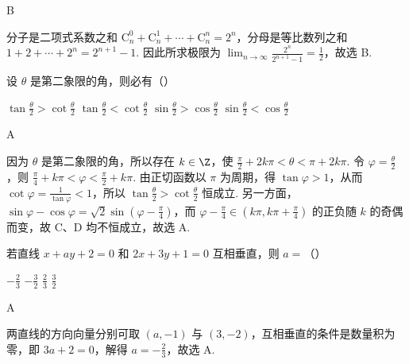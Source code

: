 \begin{answer}
B
\end{answer}

\begin{solution}
分子是二项式系数之和 \(\mathrm C_n^0 + \mathrm C_n^1 + \cdots + \mathrm C_n^n = 2^n\)，分母是等比数列之和 \(1 + 2 + \cdots + 2^n = 2^{n+1} - 1\). 因此所求极限为 \(\displaystyle\lim_{n \to \infty} \frac{2^n}{2^{n+1} - 1} = \frac{1}{2}\)，故选 B.
\end{solution}

\begin{problem}
设 \(\theta\) 是第二象限的角，则必有（\quad）

\choices
    {\(\tan \frac{\theta}{2} > \cot \frac{\theta}{2}\)}
    {\(\tan \frac{\theta}{2} < \cot \frac{\theta}{2}\)}
    {\(\sin \frac{\theta}{2} > \cos \frac{\theta}{2}\)}
    {\(\sin \frac{\theta}{2} < \cos \frac{\theta}{2}\)}
\end{problem}

\begin{answer}
A
\end{answer}

\begin{solution}
因为 \(\theta\) 是第二象限的角，所以存在 \(k \in \Z\)，使 \(\frac{\pi}{2} + 2k\pi < \theta < \pi + 2k\pi\). 令 \(\varphi = \frac{\theta}{2}\)，则 \(\frac{\pi}{4} + k\pi < \varphi < \frac{\pi}{2} + k\pi\). 由正切函数以 \(\pi\) 为周期，得 \(\tan \varphi > 1\)，从而 \(\cot \varphi = \frac{1}{\tan \varphi} < 1\)，所以 \(\tan \frac{\theta}{2} > \cot \frac{\theta}{2}\) 恒成立.
另一方面，\(\sin \varphi - \cos \varphi = \sqrt{2}\sin \left(\varphi - \frac{\pi}{4}\right)\)，而 \(\varphi - \frac{\pi}{4} \in \left(k\pi, k\pi + \frac{\pi}{4}\right)\) 的正负随 \(k\) 的奇偶而变，故 C、D 均不恒成立，故选 A.
\end{solution}

\begin{problem}
若直线 \(x + ay + 2 = 0\) 和 \(2x + 3y + 1 = 0\) 互相垂直，则 \(a =\)（\quad）

\choices
    {\(-\frac{2}{3}\)}
    {\(-\frac{3}{2}\)}
    {\(\frac{2}{3}\)}
    {\(\frac{3}{2}\)}
\end{problem}

\begin{answer}
A
\end{answer}

\begin{solution}
两直线的方向向量分别可取 \((a, -1)\) 与 \((3, -2)\)，互相垂直的条件是数量积为零，即 \(3a + 2 = 0\)，解得 \(a = -\frac{2}{3}\)，故选 A.
\end{solution}


